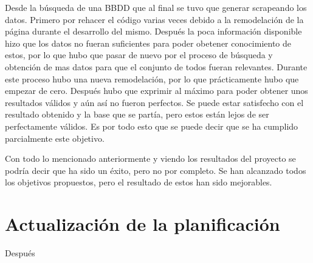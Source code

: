 \begin{itemize}
    Desde la búsqueda de una BBDD que al final se tuvo que generar scrapeando los datos. Primero
    por rehacer el código varias veces debido a la remodelación de la página durante el desarrollo
    del mismo. Después la poca información disponible hizo que los datos no fueran suficientes para
    poder obetener conocimiento de estos, por lo que hubo que pasar de nuevo por el proceso de
    búsqueda y obtención de mas datos para que el conjunto de todos fueran relevantes. Durante este
    proceso hubo una nueva remodelación, por lo que prácticamente hubo que empezar de cero. Después
    hubo que exprimir al máximo para poder obtener unos resultados válidos y aún así no fueron perfectos.
    Se puede estar satisfecho con el resultado obtenido y la base que se partía, pero estos están lejos
    de ser perfectamente válidos. Es por todo esto que se puede decir que se ha cumplido parcialmente
    este objetivo.
\end{itemize}

Con todo lo mencionado anteriormente y viendo los resultados del proyecto se podría decir que ha sido
un éxito, pero no por completo. Se han alcanzado todos los objetivos propuestos, pero el resultado
de estos han sido mejorables.

\section{Actualización de la planificación}

Después 


